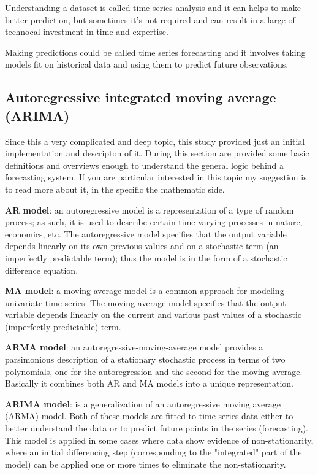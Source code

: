 Understanding a dataset is called time series analysis and it can helps to make better prediction, but sometimes it's not required and can result in a large of technocal investment in time and expertise.

Making predictions could be called time series forecasting and it involves taking models fit on historical data and using them to predict future observations.

\newpage 

\subsection{Autoregressive integrated moving average (ARIMA)}
\vspace{-5mm}
Since this a very complicated and deep topic, this study provided just an initial implementation and descripton of it. During this section are provided some basic definitions and overviews enough to understand the general logic behind a forecasting system. If you are particular interested in this topic my suggestion is to read more about it, in the specific the mathematic side.

\textbf{AR model}: an autoregressive model is a representation of a type of random process; as such, it is used to describe certain time-varying processes in nature, economics, etc. The autoregressive model specifies that the output variable depends linearly on its own previous values and on a stochastic term (an imperfectly predictable term); thus the model is in the form of a stochastic difference equation.\cite{wiki:AR}

\textbf{MA model}: a moving-average model is a common approach for modeling univariate time series. The moving-average model specifies that the output variable depends linearly on the current and various past values of a stochastic (imperfectly predictable) term.\cite{wiki:MA}

\textbf{ARMA model}: an autoregressive-moving-average model provides a parsimonious description of a stationary stochastic process in terms of two polynomials, one for the autoregression and the second for the moving average. Basically it combines both AR and MA models into a unique representation.\cite{wiki:ARMA}

\textbf{ARIMA model}: is a generalization of an autoregressive moving average (ARMA) model. Both of these models are fitted to time series data either to better understand the data or to predict future points in the series (forecasting).\\
This model is applied in some cases where data show evidence of non-stationarity, where an initial differencing step (corresponding to the "integrated" part of the model) can be applied one or more times to eliminate the non-stationarity.\cite{wiki:ARIMA}

